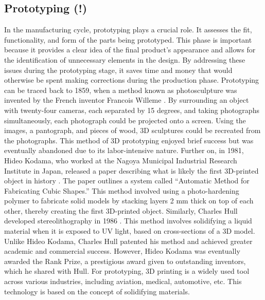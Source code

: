 \subsection{Prototyping (!)}
In the manufacturing cycle, prototyping plays a crucial role. It assesses the fit, functionality,
and form of the parts being prototyped. This phase is important because it provides a clear idea of 
the final product's appearance and allows for the identification of unnecessary elements in the design. 
By addressing these issues during the prototyping stage, it saves time and money that would otherwise be 
spent making corrections during the production phase.
\newline \newline
Prototyping can be traced back to 1859, when a method known as photosculpture was invented by 
the French inventor Francois Willeme \cite{Lengua2017}. By surrounding an object with twenty-four 
cameras, each separated by 15 degrees, and taking photographs simultaneously, each photograph could 
be projected onto a screen. Using the images, a pantograph, and pieces of wood, 3D sculptures could 
be recreated from the photographs. This method of 3D prototyping enjoyed brief success but was eventually 
abandoned due to its labor-intensive nature.
\newline \newline
Further on, in 1981, Hideo Kodama, who worked at the Nagoya Municipal Industrial Research 
Institute in Japan, released a paper describing what is likely the first 3D-printed object 
in history \cite{Lengua2017}. The paper outlines a system called ``Automatic Method for Fabricating 
Cubic Shapes.'' This method involved using a photo-hardening polymer to fabricate solid models by 
stacking layers 2 mm thick on top of each other, thereby creating the first 3D-printed object. 
Similarly, Charles Hull developed stereolithography in 1986 \cite{SU20181}. This method involves 
solidifying a liquid material when it is exposed to UV light, based on cross-sections of a 3D model.
Unlike Hideo Kodama, Charles Hull patented his method and achieved greater academic and commercial 
success. However, Hideo Kodama was eventually awarded the Rank Prize, a prestigious award given to 
outstanding inventors, which he shared with Hull.
\newline \newline
For prototyping, 3D printing is a widely used tool across various industries, including aviation,
medical, automotive, etc. This technology is based on the concept of solidifying materials. 
